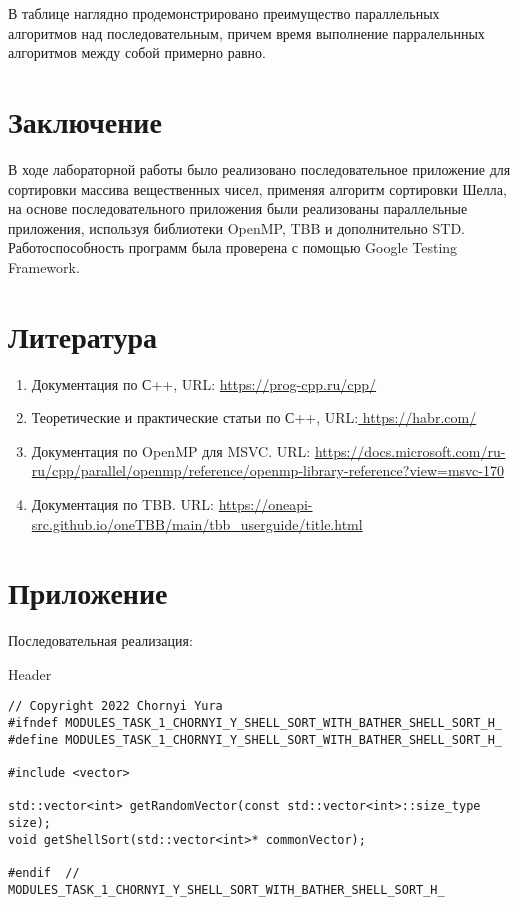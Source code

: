 \documentclass{report}
\begin{document}
\par В таблице наглядно продемонстрировано преимущество параллельных алгоритмов над последовательным, причем время выполнение парралельнных алгоритмов между собой примерно равно.

\newpage

\section*{Заключение}
В ходе лабораторной работы было реализовано последовательное приложение для сортировки массива вещественных чисел, применяя алгоритм сортировки Шелла, на основе последовательного приложения были реализованы параллельные приложения, используя библиотеки OpenMP, TBB и дополнительно STD. Работоспособность программ была проверена с помощью Google Testing Framework.
\newpage

\section*{Литература}
\begin{enumerate}
\item Документация по С++, URL: \url{https://prog-cpp.ru/cpp/}
\item Теоретические и практические статьи по С++, URL:\url{ https://habr.com/}
\item Документация по OpenMP для MSVC. URL: \url{https://docs.microsoft.com/ru-ru/cpp/parallel/openmp/reference/openmp-library-reference?view=msvc-170}
\item Документация по TBB. URL: \url{https://oneapi-src.github.io/oneTBB/main/tbb_userguide/title.html}
\end{enumerate} 
\newpage

\section*{Приложение}
\par Последовательная реализация:
\begin{center}
Header
\end{center}
\begin{lstlisting}
// Copyright 2022 Chornyi Yura
#ifndef MODULES_TASK_1_CHORNYI_Y_SHELL_SORT_WITH_BATHER_SHELL_SORT_H_
#define MODULES_TASK_1_CHORNYI_Y_SHELL_SORT_WITH_BATHER_SHELL_SORT_H_

#include <vector>

std::vector<int> getRandomVector(const std::vector<int>::size_type size);
void getShellSort(std::vector<int>* commonVector);

#endif  // MODULES_TASK_1_CHORNYI_Y_SHELL_SORT_WITH_BATHER_SHELL_SORT_H_
\end{lstlisting}
\end{document}
